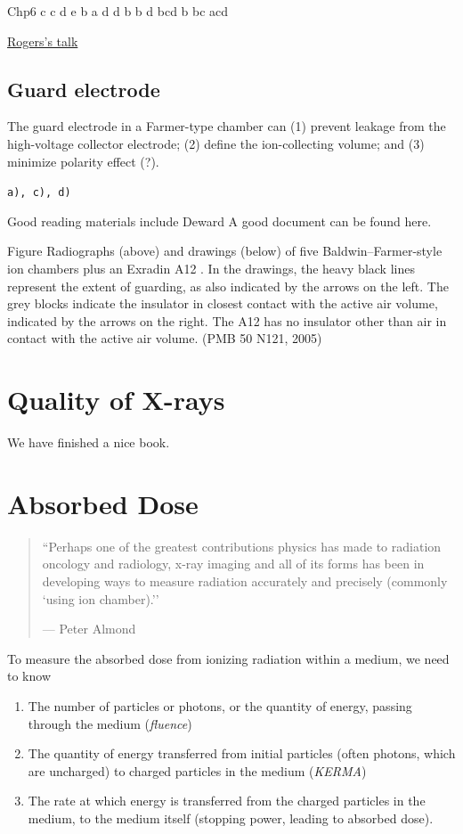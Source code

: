 \documentclass[]{book}
\providecommand{\tightlist}{%
  \setlength{\itemsep}{0pt}\setlength{\parskip}{0pt}}
\theoremstyle{definition}
\theoremstyle{definition}
\theoremstyle{definition}
\theoremstyle{remark}
\begin{document}
Chp6 c c d e b a d d b b d bcd b bc acd

\href{https://www.aapm.org/meetings/09SS/documents/05Seuntjens-MonteCarloIntro.pdf}{Rogers's
talk}

\section{Guard electrode}\label{guard-electrode}

The guard electrode in a Farmer-type chamber can (1) prevent leakage
from the high-voltage collector electrode; (2) define the ion-collecting
volume; and (3) minimize polarity effect (?).

\texttt{a),\ c),\ d)}

Good reading materials include Deward A good document can be found here.

Figure Radiographs (above) and drawings (below) of five
Baldwin--Farmer-style ion chambers plus an Exradin A12 . In the
drawings, the heavy black lines represent the extent of guarding, as
also indicated by the arrows on the left. The grey blocks indicate the
insulator in closest contact with the active air volume, indicated by
the arrows on the right. The A12 has no insulator other than air in
contact with the active air volume. (PMB 50 N121, 2005)

\chapter{Quality of X-rays}\label{quality}

We have finished a nice book.

\chapter{Absorbed Dose}\label{dose}

\begin{quote}
``Perhaps one of the greatest contributions physics has made to
radiation oncology and radiology, x-ray imaging and all of its forms has
been in developing ways to measure radiation accurately and precisely
(commonly `using ion chamber).''

--- Peter Almond
\end{quote}

To measure the absorbed dose from ionizing radiation within a medium, we
need to know

\begin{enumerate}
\def\labelenumi{\arabic{enumi}.}
\tightlist
\item
  The number of particles or photons, or the quantity of energy, passing
  through the medium (\emph{fluence})
\item
  The quantity of energy transferred from initial particles (often
  photons, which are uncharged) to charged particles in the medium
  (\emph{KERMA})
\item
  The rate at which energy is transferred from the charged particles in
  the medium, to the medium itself (stopping power, leading to absorbed
  dose).
\end{enumerate}
\end{document}
